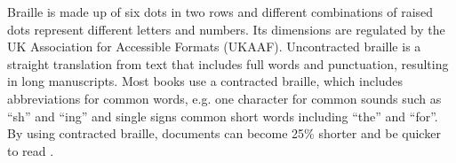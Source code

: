 Braille is made up of six dots in two rows and different combinations of raised dots represent different letters and numbers.
Its dimensions are regulated by the UK Association for Accessible Formats (UKAAF). 
Uncontracted braille is a straight translation from text that includes full words and punctuation, resulting in long manuscripts.
Most books use a contracted braille, which includes abbreviations for common words, e.g. one character for common sounds such as ``sh'' and ``ing'' and single signs common short words including ``the'' and ``for''.
By using contracted braille, documents can become 25\% shorter and be quicker to read \cite{royal_national_institute_of_blind_people_braille_nodate,sense_braille_nodate}.